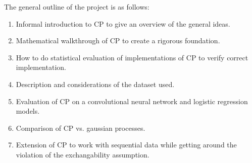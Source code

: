 The general outline of the project is as follows:
\begin{enumerate}
    \item Informal introduction to CP to give an overview of the general ideas.
    \item Mathematical walkthrough of CP to create a rigorous foundation. 
    \item How to do statistical evaluation of implementations of CP to verify correct implementation.
    \item Description and considerations of the dataset used.
    \item Evaluation of CP on a convolutional neural network and logistic regression models.
    \item Comparison of CP vs. gaussian processes.
    \item Extension of CP to work with sequential data while getting around the violation of the exchangability assumption.
\end{enumerate}


